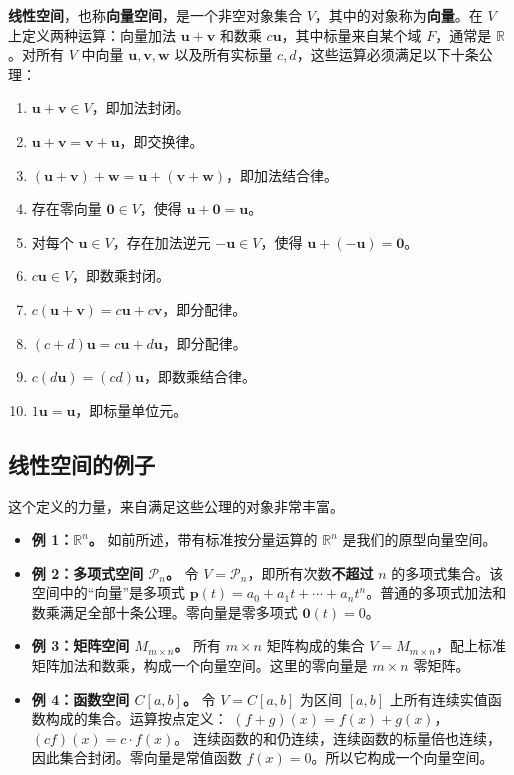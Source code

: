 \begin{definition}
\textbf{线性空间}，也称\textbf{向量空间}，是一个非空对象集合 $V$，其中的对象称为\textbf{向量}。在 $V$ 上定义两种运算：向量加法 $\mathbf{u}+\mathbf{v}$ 和数乘 $c\mathbf{u}$，其中标量来自某个域 $F$，通常是 $\mathbb{R}$。对所有 $V$ 中向量 $\mathbf{u},\mathbf{v},\mathbf{w}$ 以及所有实标量 $c,d$，这些运算必须满足以下十条公理：
\begin{enumerate}
    \item $\mathbf{u}+\mathbf{v}\in V$，即加法封闭。
    \item $\mathbf{u}+\mathbf{v}=\mathbf{v}+\mathbf{u}$，即交换律。
    \item $(\mathbf{u}+\mathbf{v})+\mathbf{w}=\mathbf{u}+(\mathbf{v}+\mathbf{w})$，即加法结合律。
    \item 存在零向量 $\mathbf{0}\in V$，使得 $\mathbf{u}+\mathbf{0}=\mathbf{u}$。
    \item 对每个 $\mathbf{u}\in V$，存在加法逆元 $-\mathbf{u}\in V$，使得 $\mathbf{u}+(-\mathbf{u})=\mathbf{0}$。
    \item $c\mathbf{u}\in V$，即数乘封闭。
    \item $c(\mathbf{u}+\mathbf{v})=c\mathbf{u}+c\mathbf{v}$，即分配律。
    \item $(c+d)\mathbf{u}=c\mathbf{u}+d\mathbf{u}$，即分配律。
    \item $c(d\mathbf{u})=(cd)\mathbf{u}$，即数乘结合律。
    \item $1\mathbf{u}=\mathbf{u}$，即标量单位元。
\end{enumerate}
\end{definition}

\subsection{线性空间的例子}
这个定义的力量，来自满足这些公理的对象非常丰富。
\begin{itemize}
    \item \textbf{例 1：$\mathbb{R}^n$。}
    如前所述，带有标准按分量运算的 $\mathbb{R}^n$ 是我们的原型向量空间。
    \item \textbf{例 2：多项式空间 $\mathcal{P}_n$。}
    令 $V=\mathcal{P}_n$，即所有次数\textbf{不超过} $n$ 的多项式集合。该空间中的“向量”是多项式 $\mathbf{p}(t)=a_0+a_1t+\cdots+a_nt^n$。普通的多项式加法和数乘满足全部十条公理。零向量是零多项式 $\mathbf{0}(t)=0$。
    \item \textbf{例 3：矩阵空间 $M_{m\times n}$。}
    所有 $m\times n$ 矩阵构成的集合 $V=M_{m\times n}$，配上标准矩阵加法和数乘，构成一个向量空间。这里的零向量是 $m\times n$ 零矩阵。
    \item \textbf{例 4：函数空间 $C[a,b]$。}
    令 $V=C[a,b]$ 为区间 $[a,b]$ 上所有连续实值函数构成的集合。运算按点定义：
    $(f+g)(x)=f(x)+g(x)$，$(cf)(x)=c\cdot f(x)$。
    连续函数的和仍连续，连续函数的标量倍也连续，因此集合封闭。零向量是常值函数 $f(x)=0$。所以它构成一个向量空间。
\end{itemize}

